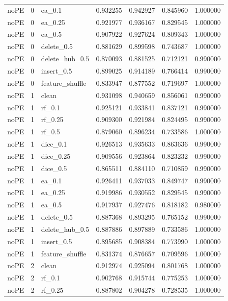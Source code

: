 \documentclass[UTF8,a4paper,11pt,fontset=fandol]{ctexart}
\begin{document}
{\begin{longtable}{lrlrrrr}
noPE & 0 & ea\_0.1 & 0.932255 & 0.942927 & 0.845960 & 1.000000 \\
noPE & 0 & ea\_0.25 & 0.921977 & 0.936167 & 0.829545 & 1.000000 \\
noPE & 0 & ea\_0.5 & 0.907922 & 0.927624 & 0.809343 & 1.000000 \\
noPE & 0 & delete\_0.5 & 0.881629 & 0.899598 & 0.743687 & 1.000000 \\
noPE & 0 & delete\_hub\_0.5 & 0.870093 & 0.881525 & 0.712121 & 0.990000 \\
noPE & 0 & insert\_0.5 & 0.899025 & 0.914189 & 0.766414 & 0.990000 \\
noPE & 0 & feature\_shuffle & 0.833947 & 0.877552 & 0.719697 & 1.000000 \\
noPE & 1 & clean & 0.931098 & 0.940659 & 0.856061 & 0.990000 \\
noPE & 1 & rf\_0.1 & 0.925121 & 0.933841 & 0.837121 & 0.990000 \\
noPE & 1 & rf\_0.25 & 0.909300 & 0.921984 & 0.824495 & 0.990000 \\
noPE & 1 & rf\_0.5 & 0.879060 & 0.896234 & 0.733586 & 1.000000 \\
noPE & 1 & dice\_0.1 & 0.926513 & 0.935633 & 0.863636 & 0.990000 \\
noPE & 1 & dice\_0.25 & 0.909556 & 0.923864 & 0.823232 & 0.990000 \\
noPE & 1 & dice\_0.5 & 0.865511 & 0.884110 & 0.710859 & 0.990000 \\
noPE & 1 & ea\_0.1 & 0.926411 & 0.937033 & 0.849747 & 0.990000 \\
noPE & 1 & ea\_0.25 & 0.919986 & 0.930552 & 0.829545 & 0.990000 \\
noPE & 1 & ea\_0.5 & 0.917937 & 0.927476 & 0.818182 & 0.980000 \\
noPE & 1 & delete\_0.5 & 0.887368 & 0.893295 & 0.765152 & 0.990000 \\
noPE & 1 & delete\_hub\_0.5 & 0.887886 & 0.897889 & 0.733586 & 1.000000 \\
noPE & 1 & insert\_0.5 & 0.895685 & 0.908384 & 0.773990 & 1.000000 \\
noPE & 1 & feature\_shuffle & 0.831374 & 0.876657 & 0.709596 & 1.000000 \\
noPE & 2 & clean & 0.912974 & 0.925094 & 0.801768 & 1.000000 \\
noPE & 2 & rf\_0.1 & 0.902768 & 0.915744 & 0.775253 & 1.000000 \\
noPE & 2 & rf\_0.25 & 0.887802 & 0.904278 & 0.728535 & 1.000000 \\

\end{longtable}}
\end{document}
